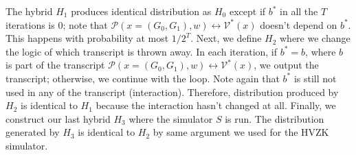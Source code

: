 The hybrid $H_1$ produces identical distribution as $H_0$ except if $b^*$ in all the $T$ iterations is $0$; note that $\mathcal{P}(x=(G_0, G_1), w)\leftrightarrow \mathcal{V^*}(x)$ doesn't depend on $b^*$. This happens with probability at most $1/2^T$. Next, we define $H_2$ where we change the logic of which transcript is thrown away. In each iteration, if $b^* = b$, where $b$ is part of the transcript $\mathcal{P}(x=(G_0, G_1), w)\leftrightarrow \mathcal{V^*}(x)$, we output the transcript; otherwise, we continue with the loop. Note again that $b^*$ is still not used in any of the transcript (interaction). Therefore, distribution produced by $H_2$ is identical to $H_1$ because the interaction hasn't changed at all. Finally, we construct our last hybrid $H_3$ where the simulator $S$ is run. The distribution generated by $H_3$ is identical to $H_2$ by same argument we used for the HVZK simulator.

		  
%		

